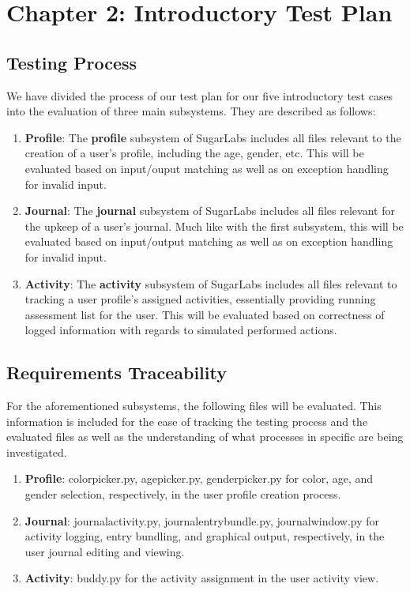 \documentclass{article}
\begin{document}
\section{Chapter 2: Introductory Test Plan}
\subsection{Testing Process}
We have divided the process of our test plan for our five introductory test cases into the evaluation of three main subsystems. They are described as follows:
\begin{enumerate}
\itemsep-0.5em
\item \textbf{Profile}: The \textbf{profile} subsystem of SugarLabs includes all files relevant to the creation of a user's profile, including the age, gender, etc. This will be evaluated based on input/ouput matching as well as on exception handling for invalid input.
\item \textbf{Journal}: The \textbf{journal} subsystem of SugarLabs includes all files relevant for the upkeep of a user's journal. Much like with the first subsystem, this will be evaluated based on input/output matching as well as on exception handling for invalid input.
\item \textbf{Activity}: The \textbf{activity} subsystem of SugarLabs includes all files relevant to tracking a user profile's assigned activities, essentially providing running assessment list for the user. This will be evaluated based on correctness of logged information with regards to simulated performed actions.
\end{enumerate}
\subsection{Requirements Traceability}
\label{ReqTrace}
For the aforementioned subsystems, the following files will be evaluated. This information is included for the ease of tracking the testing process and the evaluated files as well as the understanding of what processes in specific are being investigated.
\begin{enumerate}
\itemsep-0.5em
\item \textbf{Profile}: colorpicker.py, agepicker.py, genderpicker.py for color, age, and gender selection, respectively, in the user profile creation process.
\item \textbf{Journal}: journalactivity.py, journalentrybundle.py, journalwindow.py for activity logging, entry bundling, and graphical output, respectively, in the user journal editing and viewing.
\item \textbf{Activity}: buddy.py for the activity assignment in the user activity view.
\end{enumerate}
\end{document}
